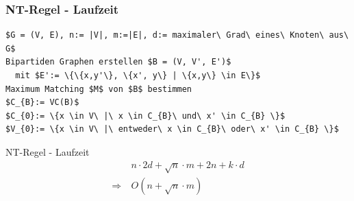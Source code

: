 \documentclass{beamer}
\begin{document}
\begin{frame}[fragile]
\frametitle{NT-Regel - Laufzeit}
\begin{lstlisting}[mathescape = true, basicstyle=\ttfamily]
$G = (V, E), n:= |V|, m:=|E|, d:= maximaler\ Grad\ eines\ Knoten\ aus\ G$
Bipartiden Graphen erstellen $B = (V, V', E')$ 
  mit $E':= \{\{x,y'\}, \{x', y\} | \{x,y\} \in E\}$ 
Maximum Matching $M$ von $B$ bestimmen 
$C_{B}:= VC(B)$ 
$C_{0}:= \{x \in V\ |\ x \in C_{B}\ und\ x' \in C_{B} \}$ 
$V_{0}:= \{x \in V\ |\ entweder\ x \in C_{B}\ oder\ x' \in C_{B} \}$ 
\end{lstlisting}
\end{frame}
\begin{frame}{NT-Regel - Laufzeit}
\begin{align*}
&\ n \cdot 2d + \sqrt{n} \cdot m + 2n + k \cdot d\\  
\Rightarrow &\ O(n + \sqrt{n} \cdot m)
\end{align*}
\end{frame}
\end{document}
